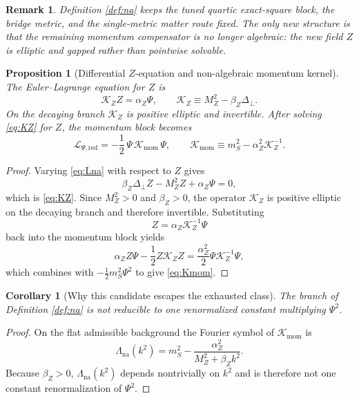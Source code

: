 \documentclass[11pt]{article}
\newcommand{\KZ}{\mathcal K_Z}
\newcommand{\Kmom}{\mathcal K_{\mathrm{mom}}}
\newtheorem{proposition}{Proposition}
\newtheorem{remark}{Remark}
\newtheorem{corollary}{Corollary}
\begin{document}
\begin{remark}
Definition \ref{def:na} keeps the tuned quartic exact-square block, the bridge metric, and the single-metric matter route fixed. The only new structure is that the remaining momentum compensator is no longer algebraic: the new field \(Z\) is elliptic and gapped rather than pointwise solvable.
\end{remark}

\begin{proposition}[Differential \(Z\)-equation and non-algebraic momentum kernel]
\label{prop:KZ}
The Euler--Lagrange equation for \(Z\) is
\begin{equation}
\KZ Z
=
\alpha_Z\Psi,
\qquad
\KZ\equiv M_Z^2-\beta_Z\Delta_\perp.
\label{eq:KZ}
\end{equation}
On the decaying branch \(\KZ\) is positive elliptic and invertible. After solving \eqref{eq:KZ} for \(Z\), the momentum block becomes
\begin{equation}
\mathcal L_{\Psi,\mathrm{red}}
=
-\frac12\,\Psi\,\Kmom\,\Psi,
\qquad
\Kmom
\equiv
m_S^2-\alpha_Z^2\KZ^{-1}.
\label{eq:Kmom}
\end{equation}
\end{proposition}

\begin{proof}
Varying \eqref{eq:Lna} with respect to \(Z\) gives
\[
\beta_Z\Delta_\perp Z-M_Z^2Z+\alpha_Z\Psi=0,
\]
which is \eqref{eq:KZ}. Since \(M_Z^2>0\) and \(\beta_Z>0\), the operator \(\KZ\) is positive elliptic on the decaying branch and therefore invertible. Substituting
\[
Z=\alpha_Z\KZ^{-1}\Psi
\]
back into the momentum block yields
\[
\alpha_Z Z\Psi
-\frac12 Z\KZ Z
=
\frac{\alpha_Z^2}{2}\Psi\KZ^{-1}\Psi,
\]
which combines with \(-\frac12m_S^2\Psi^2\) to give \eqref{eq:Kmom}.
\end{proof}

\begin{corollary}[Why this candidate escapes the exhausted class]
\label{cor:escape}
The branch of Definition \ref{def:na} is not reducible to one renormalized constant multiplying \(\Psi^2\).
\end{corollary}

\begin{proof}
On the flat admissible background the Fourier symbol of \(\Kmom\) is
\begin{equation}
\Lambda_{\mathrm{na}}(k^2)
=
m_S^2-\frac{\alpha_Z^2}{M_Z^2+\beta_Zk^2}.
\label{eq:Lambdana}
\end{equation}
Because \(\beta_Z>0\), \(\Lambda_{\mathrm{na}}(k^2)\) depends nontrivially on \(k^2\) and is therefore not one constant renormalization of \(\Psi^2\).
\end{proof}
\end{document}

